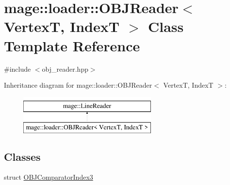 \hypertarget{classmage_1_1loader_1_1_o_b_j_reader}{}\section{mage\+:\+:loader\+:\+:O\+B\+J\+Reader$<$ VertexT, IndexT $>$ Class Template Reference}
\label{classmage_1_1loader_1_1_o_b_j_reader}


{\ttfamily \#include $<$obj\+\_\+reader.\+hpp$>$}

Inheritance diagram for mage\+:\+:loader\+:\+:O\+B\+J\+Reader$<$ VertexT, IndexT $>$\+:\begin{figure}[H]
\begin{center}
\leavevmode
\includegraphics[height=2.000000cm]{classmage_1_1loader_1_1_o_b_j_reader}
\end{center}
\end{figure}
\subsection*{Classes}
\begin{DoxyCompactItemize}
\item 
struct \hyperlink{structmage_1_1loader_1_1_o_b_j_reader_1_1_o_b_j_comparator_index3}{O\+B\+J\+Comparator\+Index3}
\end{DoxyCompactItemize}

